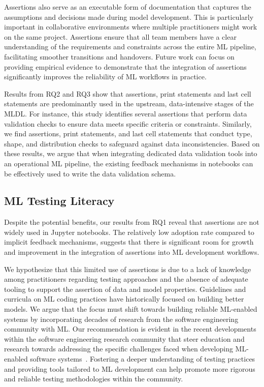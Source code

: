 \documentclass[journal]{IEEEtran}       %
\begin{document}
Assertions also serve as an executable form of documentation that
captures the assumptions and decisions made during model development.
This is particularly important in collaborative environments where
multiple practitioners might work on the same project. Assertions
ensure that all team members have a clear understanding of the
requirements and constraints across the entire ML pipeline,
facilitating smoother transitions and handovers. Future work can
focus on providing empirical evidence to demonstrate that the
integration of assertions significantly improves the reliability of
ML workflows in practice.

Results from RQ2 and RQ3 show that assertions, print statements and
last cell statements are predominantly used in the upstream,
data-intensive stages of the MLDL. For instance, this study
identifies several assertions that perform data validation checks to
ensure data meets specific criteria or constraints. Similarly, we
find assertions, print statements, and last cell statements that
conduct type, shape, and distribution checks to safeguard against
data inconsistencies. Based on these results, we argue that when
integrating dedicated data validation tools into an operational ML
pipeline, the existing feedback mechanisms in notebooks can be
effectively used to write the data validation schema.

\subsection{ML Testing Literacy}

Despite the potential benefits, our results from RQ1 reveal that
assertions are not widely used in Jupyter notebooks. The relatively
low adoption rate compared to implicit feedback mechanisms, suggests
that there is significant room for growth and improvement in the
integration of assertions into ML development workflows.

We hypothesize that this limited use of assertions is due to a lack
of knowledge among practitioners regarding testing approaches and the
absence of adequate tooling to support the assertion of data and
model properties. Guidelines and curricula on ML coding practices
have historically focused on building better models. We argue that
the focus must shift towards building reliable ML-enabled systems by
incorporating decades of research from the software engineering
community with ML. Our recommendation is evident in the recent
developments within the software engineering research community that
steer education and research towards addressing the specific
challenges faced when developing ML-enabled software
systems~\cite{kastner2020teaching,lanubile2021towards,lanubile2023teaching}.
Fostering a deeper understanding of testing practices and providing
tools tailored to ML development can help promote more rigorous and
reliable testing methodologies within the community.
\end{document}
